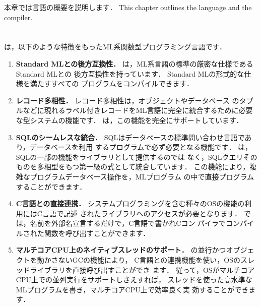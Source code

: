 \ifjp%
本章では\smlsharp{}言語の概要を説明します．
\else%
This chapter outlines the \smlsharp{} language and the compiler.
\fi%

\section{}
\label{sec:whatIsSmlsharp}

\ifjp%
\smlsharp{}は，以下のような特徴をもったML系関数型プログラミング言語です．
\begin{enumerate}
\item {\bf Standard MLとの後方互換性．}
	\smlsharp{}は，ML系言語の標準の厳密な仕様であるStandard MLとの
後方互換性を持っています．
	Standard MLの形式的な仕様\cite{sml}を満たすすべての
プログラムをコンパイルできます．

\item {\bf レコード多相性．}
	レコード多相性\cite{ohor95toplas}は，オブジェクトやデータベース
のタプルなどに現れるラベル付きレコードをML言語に完全に統合するために必要
な型システムの機能です．
	\smlsharp{}は，この機能を完全にサポートしています．

\item {\bf SQLのシームレスな統合．}
	SQLはデータベースの標準問い合わせ言語であり，データベースを利用
するプログラムで必ず必要となる機能です．
	\smlsharp{}は，SQLの一部の機能をライブラリとして提供するのでは
なく，SQLクエリそのものを多相型をもつ第一級の式として統合しています．
	この機能により，複雑なプログラムデータベース操作を，MLプログラム
の中で直接プログラムすることができます．
	
\item {\bf C言語との直接連携．}
	システムプログラミングを含む種々のOSの機能の利用にはC言語で記述
されたライブラリへのアクセスが必要となります．
	\smlsharp{}では，名前を外部名宣言するだけで，C言語で書かれCコン
パイラでコンパイルされた関数を呼び出すことができます．

\item {\bf マルチコアCPU上のネイティブスレッドのサポート．}
	\smlsharp{}の並行かつオブジェクトを動かさないGCの機能により，
C言語との連携機能を使い，OSのスレッドライブラリを直接呼び出すことができ
ます．
	従って，OSがマルチコアCPU上での並列実行をサポートしさえすれば，
スレッドを使った高水準なMLプログラムを書き，マルチコアCPU上で効率良く実
効することができます．


\end{enumerate}
